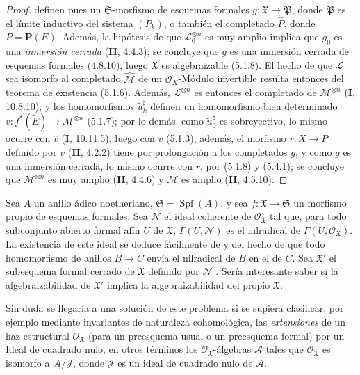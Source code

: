 \begin{proof}
definen pues un $\mathfrak S$-morfismo de esquemas formales
$g:\mathfrak X\to\mathfrak P$, donde $\mathfrak P$ es el límite inductivo del
sistema $(P_k)$, o también el completado $\widehat P$, donde $P=\mathbf P(E)$.
Además, la hipótesis de que $\mathcal L_0^{\otimes n}$ es muy amplio implica que
$g_0$ es una \emph{inmersión cerrada} (\textbf{II}, 4.4.3); se concluye que $g$ es una
inmersión cerrada de esquemas formales (4.8.10), luego $\mathfrak X$ es
algebraizable (5.1.8). El hecho de que $\mathcal L$ sea isomorfo al completado
$\widehat{\mathcal M}$ de un $\mathcal O_X$-Módulo invertible resulta entonces del
teorema de existencia (5.1.6). Además, $\mathcal L^{\otimes n}$ es entonces el
completado de $\mathcal M^{\otimes n}$ (\textbf{I}, 10.8.10), y los homomorfismos
$\widetilde u_k^\sharp$ definen un homomorfismo bien determinado
$v:f^*(\widetilde E)\longrightarrow\mathcal M^{\otimes n}$
(5.1.7); por lo demás, como $\widetilde u_0^\sharp$ es sobreyectivo, lo mismo ocurre con
$\widehat v$ (\textbf{I}, 10.11.5), luego con $v$ (5.1.3); además, el morfismo
$r:X\to P$ definido por $v$ (\textbf{II}, 4.2.2) tiene por prolongación a los completados $g$,
y como $g$ es una inmersión cerrada, lo mismo ocurre con $r$, por (5.1.8)
y (5.4.1); se concluye que $\mathcal M^{\otimes n}$ es muy amplio
(\textbf{II}, 4.4.6) y $\mathcal M$ es amplio (\textbf{II}, 4.5.10).
\end{proof}

\begin{remark}[5.4.6]
\label{III.5.4.6}
\label{III.5.4.6-fr}
Sea $A$ un anillo ádico noetheriano, $\mathfrak S=\operatorname{Spf}(A)$, y sea
$f:\mathfrak X\to\mathfrak S$ un morfismo propio de esquemas
formales. Sea $\mathcal N$ el ideal coherente de
$\mathcal O_{\mathfrak X}$ tal que, para todo subconjunto abierto
formal afín $U$ de $\mathfrak X$,
$\Gamma(U,\mathcal N)$
es el nilradical de
$\Gamma(U,\mathcal O_{\mathfrak X})$. La existencia de este ideal
se deduce fácilmente de  y del hecho de que
todo homomorfismo de anillos $B\to C$ envía el nilradical de $B$ en
el de $C$. Sea $\mathfrak X'$ el subesquema formal cerrado de
$\mathfrak X$ definido por $\mathcal N$
. Sería interesante saber si la
algebraizabilidad de $\mathfrak X'$ implica la algebraizabilidad del
propio $\mathfrak X$.

Sin duda se llegaría a una solución de este problema si se supiera
clasificar, por ejemplo mediante invariantes
de naturaleza cohomológica, las \emph{extensiones} de un haz estructural
$\mathcal O_{\mathfrak X}$ (para un preesquema usual o un preesquema formal) por un Ideal de cuadrado nulo, en otros términos los $\mathcal O_{\mathfrak X}$-álgebras $\mathcal A$ tales que $\mathcal O_{\mathfrak X}$ es isomorfo a
$\mathcal A/\mathcal J$, donde $\mathcal J$ es un
ideal de cuadrado nulo de $\mathcal A$.
\end{remark}


